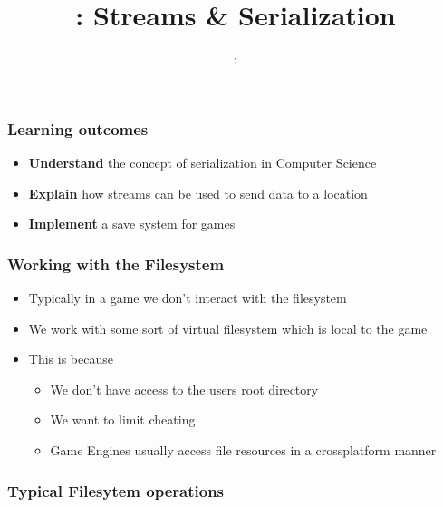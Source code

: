 \usepackage{../../beamerthemeFalmouthGamesAcademy}
\usepackage{multimedia}
\graphicspath{ {../../} }


\usepackage[normalem]{ulem}
\usepackage{wasysym}
\usepackage{listings}
\usepackage{pdfpages}

\usetikzlibrary{arrows,automata}




\title{\sessionnumber: Streams \& Serialization}
\subtitle{\modulecode: \moduletitle}

\frame{\titlepage}

\begin{frame}
	\frametitle{Learning outcomes}
	\begin{itemize}
		\item \textbf{Understand} the concept of serialization in Computer Science
		\item \textbf{Explain} how streams can be used to send data to a location
		\item \textbf{Implement} a save system for games
	\end{itemize}
\end{frame}

\begin{frame}
	\frametitle{Working with the Filesystem}
	\begin{itemize}
		\item Typically in a game we don't interact with the filesystem
		\item We work with some sort of virtual filesystem which is local to the game
		\item This is because
		\begin{itemize}
				\item We don't have access to the users root directory
				\item We want to limit cheating
				\item Game Engines usually access file resources in a crossplatform manner
		\end{itemize}
	\end{itemize}
\end{frame}

\begin{frame}
	\frametitle{Typical Filesytem operations}
	
\end{frame}

